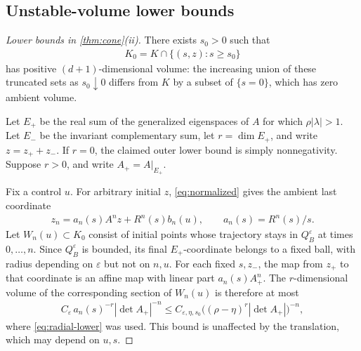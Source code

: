 \documentclass[11pt,a4paper]{article}
\theoremstyle{definition}
\theoremstyle{remark}
\begin{document}
\subsection{Unstable-volume lower bounds}

\begin{proof}[Lower bounds in \cref{thm:cone}(ii)]
There exists \(s_0>0\) such that
\begin{align*}
 K_0=K\cap\{(s,z):s\geq s_0\}
\end{align*}
has positive \((d+1)\)-dimensional volume: the increasing union of these truncated sets as \(s_0\downarrow0\) differs from \(K\) by a subset of \(\{s=0\}\), which has zero ambient volume.

Let \(E_+\) be the real sum of the generalized eigenspaces of \(A\) for which \(\rho|\lambda|>1\). Let \(E_-\) be the invariant complementary sum, let \(r=\dim E_+\), and write \(z=z_++z_-\). If \(r=0\), the claimed outer lower bound is simply nonnegativity. Suppose \(r>0\), and write \(A_+=A|_{E_+}\).

Fix a control \(u\). For arbitrary initial \(z\), \eqref{eq:normalized} gives the ambient last coordinate
\begin{align}\label{eq:ambient-final}
 z_n=a_n(s)A^n z+R^n(s)b_n(u),\qquad
 a_n(s)=R^n(s)/s.
\end{align}
Let \(W_n(u)\subset K_0\) consist of initial points whose trajectory stays in \(Q_B^\varepsilon\) at times \(0,\ldots,n\). Since \(Q_B^\varepsilon\) is bounded, its final \(E_+\)-coordinate belongs to a fixed ball, with radius depending on \(\varepsilon\) but not on \(n,u\). For each fixed \(s,z_-\), the map from \(z_+\) to that coordinate is an affine map with linear part \(a_n(s)A_+^n\). The \(r\)-dimensional volume of the corresponding section of \(W_n(u)\) is therefore at most
\begin{align*}
 C_\varepsilon\,a_n(s)^{-r}|\det A_+|^{-n}
 \leq C_{\varepsilon,\eta,s_0}
       \bigl((\rho-\eta)^r|\det A_+|\bigr)^{-n},
\end{align*}
where \eqref{eq:radial-lower} was used. This bound is unaffected by the translation, which may depend on \(u,s\).


\end{proof}
\end{document}
